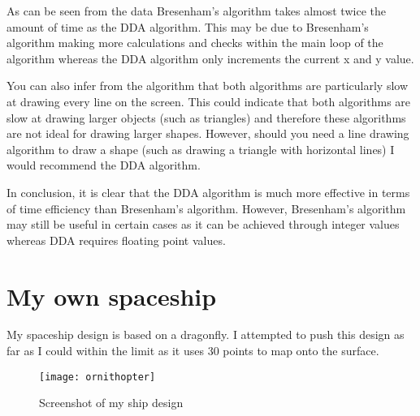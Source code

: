 \documentclass[
	a4paper, %
	10pt, %
]{CSUniSchoolLabReport}
\begin{document}
\begin{flushleft}
	As can be seen from the data Bresenham's algorithm takes almost twice the amount of time 
	as the DDA algorithm. This may be due to Bresenham's algorithm making more calculations and checks
	within the main loop of the algorithm whereas the DDA algorithm only increments the current x and y value.
\end{flushleft}
\begin{flushleft}
	You can also infer from the algorithm that both algorithms are particularly slow at drawing every line 
	on the screen. This could indicate that both algorithms are slow at drawing larger objects (such as triangles)
	and therefore these algorithms are not ideal for drawing larger shapes. However, should you need a line 
	drawing algorithm to draw a shape (such as drawing a triangle with horizontal lines) I would recommend
	the DDA algorithm.
\end{flushleft}
\begin{flushleft}
	In conclusion, it is clear that the DDA algorithm is much more effective in terms of time efficiency than
	Bresenham's algorithm. However, Bresenham's algorithm may still be useful in certain cases as it can be 
	achieved through integer values whereas DDA requires floating point values.
\end{flushleft}
\pagebreak
\section{My own spaceship}
\begin{flushleft}
	My spaceship design is based on a dragonfly. I attempted to push this design as 
	far as I could within the limit as it uses 30 points to map onto the surface.
\end{flushleft}
\begin{figure}[h]
	\centering
	\texttt{[image: ornithopter]}
	\caption{Screenshot of my ship design}
\end{figure}

\cite{Badshah:2023}

\subsection*{}

\printbibliography%

\end{document}
